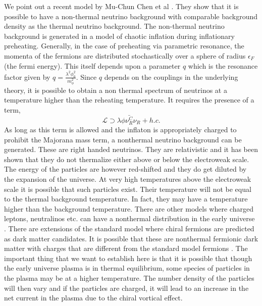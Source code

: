 \documentclass{ws-mpla}
\begin{document}
 We point out a recent model by Mu-Chun Chen et al \cite{chen}. They show that it is  possible to have a non-thermal neutrino background 
with comparable background density as the thermal neutrino background. The non-thermal neutrino background is generated in a model of chaotic inflation during 
inflationary preheating. Generally, in the case of preheating via parametric resonance, the momenta of the fermions are distributed stochastically over a sphere of 
radius $\epsilon_F$ (the fermi energy). This itself depends upon a parameter $q$ which is the resonance factor given by $q = \frac{\lambda^2 \phi_{0}^2}{m_{\phi}^2} $. 
Since $q$ depends on the couplings in the underlying theory, it is possible to obtain a non thermal spectrum of neutrinos at a temperature higher than the reheating 
temperature. It requires the presence of a term, 
\begin{equation}
 \mathcal{L} \supset \lambda \phi \bar{\nu_R^C} \nu_R + h.c.
\end{equation}
As long as this term is allowed and the inflaton is appropriately charged to prohibit the Majorana mass term, a nonthermal neutrino background can be generated.
These are right handed neutrinos. They are relativistic and it has been shown that they do not thermalize either above or below 
the electroweak scale. The energy of the particles are however red-shifted and they do get diluted  by the expansion of the universe. At very high temperatures above the 
electroweak scale it is possible that such particles exist. Their temperature will not be equal to the thermal background temperature. In fact, they may have a temperature 
higher than the background temperature. There are other models where charged leptons, neutralinos etc. can have a nonthermal distribution in the early universe 
\cite{asaka,covi,dermer}. There are extensions of the standard model where chiral fermions are predicted \cite{patra,basso} as dark matter candidates. It is possible 
that these are nonthermal fermionic dark matter with charges that are different from the standard model fermions \cite{biswas}. The important thing that we 
want to establish here is that it is possible that though the early universe plasma is in thermal equilibrium, some species of particles in the plasma may be at a higher 
temperature. The number density of the particles will then vary and if the particles are charged, it will lead to an increase in the net current in the plasma due to the chiral 
vortical effect. 
\end{document}
